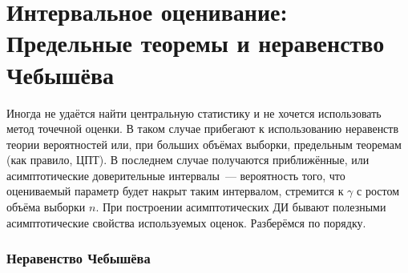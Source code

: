 \section{Интервальное оценивание: Предельные теоремы и неравенство Чебышёва}

Иногда не удаётся найти центральную статистику и не хочется использовать метод точечной оценки.
В таком случае прибегают к использованию неравенств теории вероятностей или, при больших объёмах выборки, предельным теоремам (как правило, ЦПТ).
В последнем случае получаются приближённые, или асимптотические доверительные интервалы~--- вероятность того, что оцениваемый параметр будет накрыт таким интервалом, 
стремится к $\gamma$ с ростом объёма выборки $n$.
При построении асимптотических ДИ бывают полезными асимптотические свойства используемых оценок.
Разберёмся по порядку.

\subsubsection{Неравенство Чебышёва}

